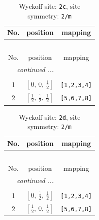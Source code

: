 \documentclass[fleqn,8pt]{jsarticle}
\begin{document}
\begin{longtable}{ccc}
\caption{Wyckoff site: {\tt 2c}, site symmetry: {\tt 2/m}}
 \\
 \hline \hline
No. & position & mapping \\ \hline \endfirsthead

\multicolumn{2}{l}{\tablename\ \thetable{}} \\
 \hline \hline
No. & position & mapping \\ \hline \endhead

 \hline \hline
\multicolumn{2}{r}{\footnotesize\it continued ...} \\ \endfoot

 \hline \hline
\multicolumn{2}{r}{} \\ \endlastfoot

1 & $\left[ 0,\, 0,\, \frac{1}{2} \right]$ & {\tt [1,2,3,4]} \\ \hline
2 & $\left[ \frac{1}{2},\, \frac{1}{2},\, \frac{1}{2} \right]$ & {\tt [5,6,7,8]} \\
\end{longtable}
\renewcommand{\arraystretch}{1.2}
\begin{longtable}{ccc}
\caption{Wyckoff site: {\tt 2d}, site symmetry: {\tt 2/m}}
 \\
 \hline \hline
No. & position & mapping \\ \hline \endfirsthead

\multicolumn{2}{l}{\tablename\ \thetable{}} \\
 \hline \hline
No. & position & mapping \\ \hline \endhead

 \hline \hline
\multicolumn{2}{r}{\footnotesize\it continued ...} \\ \endfoot

 \hline \hline
\multicolumn{2}{r}{} \\ \endlastfoot

1 & $\left[ 0,\, \frac{1}{2},\, \frac{1}{2} \right]$ & {\tt [1,2,3,4]} \\ \hline
2 & $\left[ \frac{1}{2},\, 0,\, \frac{1}{2} \right]$ & {\tt [5,6,7,8]} \\
\end{longtable}
\renewcommand{\arraystretch}{1.2}
\end{document}
